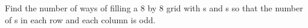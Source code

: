 Find the number of ways of filling a $8$ by $8$ grid with s and s so that the number of s in each row and each column is odd.